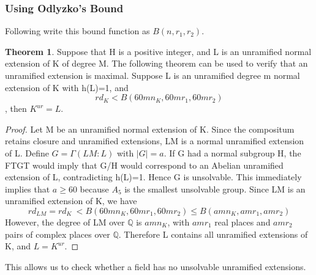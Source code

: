 \documentclass[12pt]{extarticle}
\newcommand{\<}{\langle}
\renewcommand{\>}{\rangle}
\theoremstyle{definition}
\newtheorem{theorem}{Theorem}
\begin{document}
\subsubsection*{Using Odlyzko's Bound}
Following \cite{YAMA1986} write this bound function as $B(n,r_1,r_2)$.
\begin{theorem}
Suppose that H is a positive integer, and L is an unramified normal extension of K of degree M. The following theorem can be used to verify that an unramified extension is maximal. Suppose L is an unramified degree m  normal extension of K with h(L)=1, and 
\begin{equation}
        rd_K<B(60mn_K,60mr_1,60mr_2)
    \end{equation}
, then $K^{ur}=L$.
\end{theorem}
\begin{proof}
Let M be an unramified normal extension of K. Since the compositum retains closure and unramified extensions, LM is a normal unramified extension of L. Define $G=\Gamma(LM:L)$ with $|G|=a$. If G had a normal subgroup H, the FTGT would imply that G/H would correspond to an Abelian unramified extension of L, contradicting h(L)=1. Hence G is unsolvable. This immediately implies that $a\geqslant 60$ because $A_5$ is the 
smallest unsolvable group. Since LM is an unramified extension of K, we have \begin{equation}
    rd_{LM}=rd_{K}\ < B(60mn_K,60mr_1,60mr_2)\leq  B(amn_K,amr_1,amr_2)
\end{equation} 
However, the degree of LM over $\mathbb{Q}$ is $amn_K$, with $amr_1$ real places and $amr_2$ pairs of complex places over $\mathbb{Q}$. Therefore L contains all unramified extensions of K, and $L=K^{ur}$.
\end{proof}
This allows us to check whether a field has no unsolvable unramified extensions. 
\end{document}
